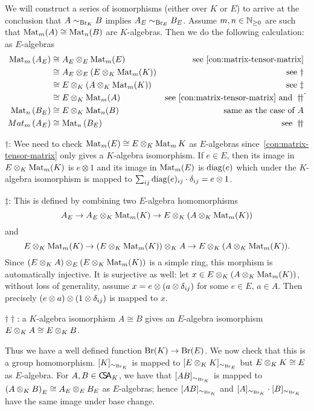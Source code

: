 \begin{construction}
  \label{con:br-base-change}
  We will construct a series of isomorphisms (either over $K$ or $E$) to arrive at the conclusion that $A\sim_{\operatorname{Br}_{K}}B$ implies $A_{E}\sim_{\operatorname{Br}_{E}}B_{E}$. Assume $m,n\in\mathbb{N}_{\ge0}$ are such that $\operatorname{Mat}_{m}(A)\cong\operatorname{Mat}_{n}(B)$ are $K$-algebras. Then we do the following calculation: as $E$-algebras
  \[
    \begin{aligned}
      \Mat_{m}\left(A_{E}\right)
      &\cong A_{E}\otimes_{E}\Mat_{m}(E) &\text{see~\cref{con:matrix-tensor-matrix}}\\
      &\cong A_{E}\otimes_{E}\left(E\ox_{K} \Mat_{m}(K)\right) & \text{see}~\dagger\\
      &\cong E \ox_{K}\left(A\ox_{K}\Mat_{m}(K)\right) &\text{see}~\ddagger\\
      &\cong E\ox_{K}\Mat_{m}(A) &\text{see~\cref{con:matrix-tensor-matrix} and}~\dagger\!\!\dagger \\
      \Mat_{n}\left(B_{E}\right) &\cong E\ox_{K}\Mat_{n}(B) &\text{same as the case of}~A\\
      Mat_{m}\left(A_{E}\right)&\cong \Mat_{n}\left(B_{E}\right) &\text{see}~\dagger\!\!\dagger
    \end{aligned}.
  \]

   \noindent$\dagger$: Wee need to check $\operatorname{Mat}_{m}(E)\cong E\otimes_{K}\operatorname{Mat}_{m}K$ as $E$-algebras since~\cref{con:matrix-tensor-matrix} only gives a $K$-algebra isomorphism. If $e \in E$, then its image in $E\otimes_{K}\operatorname{Mat}_{m}(K)$ is $e\otimes 1$ and its image in $\operatorname{Mat}_{m}(E)$ is $\operatorname{diag}(e)$ which under the $K$-algebra isomorphism is mapped to $\sum_{ij}\operatorname{diag}(e)_{ij}\cdot \delta_{ij}=e\otimes1$.

   \noindent$\ddagger$: This is defined by combining two $E$-algebra homomorphisms
   \[
     A_{E}\to A_{E}\otimes_{K}\operatorname{Mat}_{m}(K)\to E\otimes_{K}\left(A\otimes_{K}\operatorname{Mat}_{m}(K)\right)\]
     and
     \[
       E\otimes_{K}\operatorname{Mat}_{m}(K)\to \left(E\otimes_{K}\operatorname{Mat}_{m}(K)\right)\otimes_{K}A \to E\otimes_{K}(A\otimes_{K}\operatorname{Mat}_{m}(K)).
    \]
   Since $\left(E\otimes_{K}A\right)\otimes_{E}\left(E\otimes_{K}\operatorname{Mat}_{m}(K)\right)$ is a simple ring, this morphism is automatically injective. It is surjective as well: let $x\in E\otimes_{K}\left(A\otimes_{K}\operatorname{Mat}_{m}(K)\right)$, without loss of generality, assume $x=e\otimes (a\otimes\delta_{ij})$ for some $e\in E$, $a\in A$. Then precisely $\left(e\otimes a\right)\otimes\left(1\otimes\delta_{ij}\right)$ is mapped to $x$.

   \noindent$\dagger\!\dagger$: a $K$-algebra isomorphism $A\cong B$ gives an $E$-algebra isomorphism $E\otimes_{K}A \cong E\otimes_{K} B$.

   Thus we have a well defined function $\operatorname{Br}(K)\to\operatorname{Br}(E)$. We now check that this is a group homomorphism. $[K]_{\sim_{\operatorname{Br}_{K}}}$ is mapped to $[E\otimes_{K}K]_{\sim_{\operatorname{Br}_{E}}}$ but $E\otimes_{K}K\cong E$ as $E$-algebra. For $A, B\in\operatorname{\mathsf{C}\!\mathsf{S}\!\mathsf{A}}_{K}$, we have that $[AB]_{\sim_{\operatorname{Br}_{K}}}$ is mapped to $\left(A\otimes_{K}B\right)_{E}\cong A_{E}\otimes_{E} B_{E}$ as $E$-algebras; hence $[AB]_{\sim_{\operatorname{Br}_{K}}}$ and $[A]_{\sim_{\operatorname{Br}_{K}}}\cdot[B]_{\sim_{\operatorname{Br}_{K}}}$ have the same image under base change.
   \leanok
 \end{construction}
